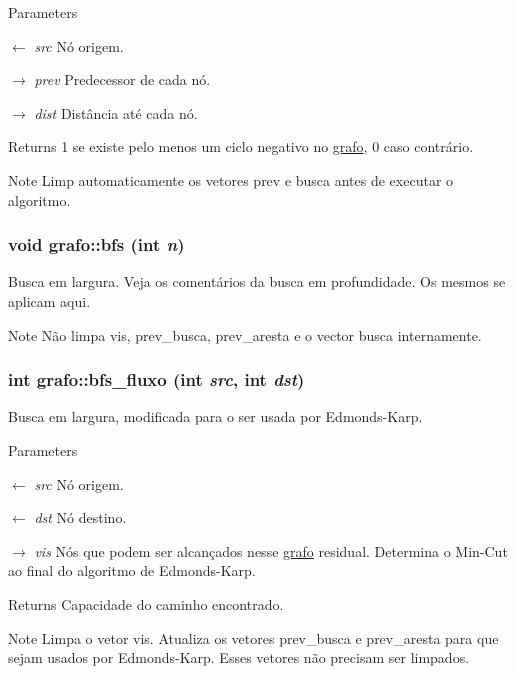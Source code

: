 \begin{DoxyParams}{Parameters}
\item[\mbox{$\leftarrow$} {\em src}]Nó origem. \item[\mbox{$\rightarrow$} {\em prev}]Predecessor de cada nó. \item[\mbox{$\rightarrow$} {\em dist}]Distância até cada nó. \end{DoxyParams}
\begin{DoxyReturn}{Returns}
1 se existe pelo menos um ciclo negativo no \hyperlink{structgrafo}{grafo}, 0 caso contrário. 
\end{DoxyReturn}
\begin{DoxyNote}{Note}
Limp automaticamente os vetores prev e busca antes de executar o algoritmo. 
\end{DoxyNote}
\hypertarget{structgrafo_a9595de9af6e7aa1209bcd1d320751d4a}{
\subsubsection[{bfs}]{\setlength{\rightskip}{0pt plus 5cm}void grafo::bfs (int {\em n})}}
\label{structgrafo_a9595de9af6e7aa1209bcd1d320751d4a}


Busca em largura. Veja os comentários da busca em profundidade. Os mesmos se aplicam aqui.

\begin{DoxyNote}{Note}
Não limpa vis, prev\_\-busca, prev\_\-aresta e o vector busca internamente. 
\end{DoxyNote}
\hypertarget{structgrafo_a3ccc56906f3bde5fe92ddd4cdcde1cf4}{
\subsubsection[{bfs\_\-fluxo}]{\setlength{\rightskip}{0pt plus 5cm}int grafo::bfs\_\-fluxo (int {\em src}, \/  int {\em dst})}}
\label{structgrafo_a3ccc56906f3bde5fe92ddd4cdcde1cf4}


Busca em largura, modificada para o ser usada por Edmonds-\/Karp. 
\begin{DoxyParams}{Parameters}
\item[\mbox{$\leftarrow$} {\em src}]Nó origem. \item[\mbox{$\leftarrow$} {\em dst}]Nó destino. \item[\mbox{$\rightarrow$} {\em vis}]Nós que podem ser alcançados nesse \hyperlink{structgrafo}{grafo} residual. Determina o Min-\/Cut ao final do algoritmo de Edmonds-\/Karp. \end{DoxyParams}
\begin{DoxyReturn}{Returns}
Capacidade do caminho encontrado. 
\end{DoxyReturn}
\begin{DoxyNote}{Note}
Limpa o vetor vis. Atualiza os vetores prev\_\-busca e prev\_\-aresta para que sejam usados por Edmonds-\/Karp. Esses vetores não precisam ser limpados. 
\end{DoxyNote}


